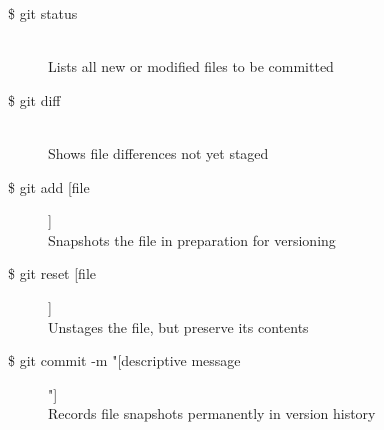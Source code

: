 \begin{description}

\item [\$ git status] \leavevmode \\
Lists all new or modified files to be committed

\item [\$ git diff] \leavevmode \\
Shows file differences not yet staged

\item [\$ git add [file]]\\
Snapshots the file in preparation for versioning

\item [\$ git reset [file]]\\
Unstages the file, but preserve its contents

\item [\$ git commit -m "[descriptive message]"]\\
Records file snapshots permanently in version history

\end{description}
\leavevmode \\


